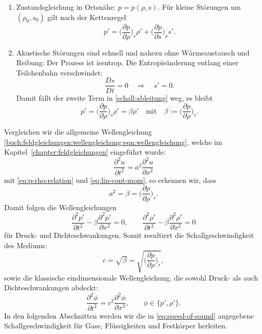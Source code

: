 \begin{enumerate}
\item Zustandsgleichung in Ortsnähe: $p=p(\rho,s)$.
      Für kleine Störungen um $(\rho_0,s_0)$ gilt nach der Kettenregel
      \begin{equation}
        p' = \biggl(\frac{\partial p}{\partial \rho}\biggr)_{s}\rho'
             + \biggl(\frac{\partial p}{\partial s}\biggr)_{\rho}s'.
	\label{schall:ableitung}
      \end{equation}
\item Akustische Störungen sind schnell und nahezu ohne Wärmeaustausch
      und Reibung: Der Prozess ist isentrop.
%
      Die Entropieänderung entlang einer Teilchenbahn verschwindet:
      \[
        \frac{Ds}{Dt}=0
        \quad\Rightarrow\quad s'=0.
      \]
      Damit fällt der zweite Term in \eqref{schall:ableitung} weg, es bleibt
      \begin{equation}
        p' = \biggl(\frac{\partial p}{\partial \rho}\biggr)_{s}\rho' = \beta\rho'
\quad\text{mit}\quad \beta :=
        \biggl(\frac{\partial p}{\partial \rho}\biggr)_{s}.
        \label{eq:p-rho-relation}
      \end{equation}
\end{enumerate}
Vergleichen wir die allgemeine Wellengleichung \eqref{buch:feldgleichungen:wellengleichung:eqn:wellengleichung},
welche im Kapitel~\ref{chapter:feldgleichungen} eingeführt wurde:
\[
    \frac{\partial^2 u}{\partial t^2} =a^2 \frac{\partial^2 u}{\partial x^2}
\]
mit \eqref{eq:p-rho-relation} und \eqref{eq:lin-cont-mom}, so erkennen wir, dass
\[    a^2 = \beta = \biggl(\frac{\partial p}{\partial \rho}\biggr)_{s}.\]
Damit folgen die Wellengleichungen
\begin{equation}
    \frac{\partial^2 p'}{\partial t^2} - \beta\frac{\partial^2 p'}{\partial x^2} = 0,
    \qquad
    \frac{\partial^2 \rho'}{\partial t^2} - \beta\frac{\partial^2 \rho'}{\partial x^2} = 0
    \label{eq:wave-equation-p-rho}
\end{equation}
für Druck- und Dichteschwankungen.
Somit resultiert die Schallgeschwindigkeit des Mediums:
\begin{equation}
    c = \sqrt{\beta} = \sqrt{\biggl(\frac{\partial p}{\partial \rho}\biggr)_{s}},
    \label{eq:speed-of-sound}
\end{equation}
sowie die klassische eindimensionale Wellengleichung, die sowohl
Druck- als auch Dichteschwankungen abdeckt:
\begin{equation}
    \frac{\partial^2 \phi}{\partial t^2} = c^2
    \frac{\partial^2 \phi}{\partial x^2}, \qquad \phi\in\{p',\rho'\}.
    \label{eq:1d-wave-equation}
\end{equation}
In den folgenden Abschnitten werden wir die in \eqref{eq:speed-of-sound}
angegebene Schallgeschwindigkeit für Gase, Flüssigkeiten und Festkörper
herleiten.

